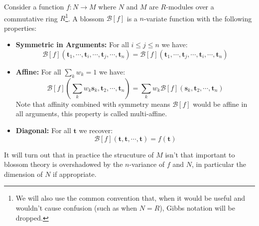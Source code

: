 
Consider a function $f:N\rightarrow M$ where $N$ and $M$ are $R$-modules over a commutative ring $R$\footnote{
We will also use the common convention that,
when it would be useful and wouldn't cause confusion (such as when $N=R$),
Gibbs notation will be dropped.
}.
A blossom $\mathcal{B}[f]$ is a $n$-variate function with the following properties:
\begin{itemize}
	\item {\bf Symmetric in Arguments:} For all $i\leq j\leq n$ we have:
		\[\mathcal{B}[f](\mathbf{t}_1,\cdots, \mathbf{t}_i, \cdots, \mathbf{t}_j, \cdots, \mathbf{t}_n) 
		= \mathcal{B}[f](\mathbf{t}_1,\cdots, \mathbf{t}_j, \cdots, \mathbf{t}_i, \cdots, \mathbf{t}_n) \]
	\item {\bf Affine:} For all $\sum_kw_k=1$ we have:
		\[\mathcal{B}[f]\left(\sum_kw_k\mathbf{s}_k,\mathbf{t}_2,\cdots,\mathbf{t}_n\right) = \sum_kw_k\mathcal{B}[f](\mathbf{s}_k,\mathbf{t}_2,\cdots,\mathbf{t}_n)\]
		Note that affinity combined with symmetry means $\mathcal{B}[f]$ would be affine in all arguments,
		this property is called multi-affine.
	\item {\bf Diagonal:} For all $\mathbf{t}$ we recover:
		\[\mathcal{B}[f](\mathbf{t},\mathbf{t},\cdots,\mathbf{t}) = f(\mathbf{t})\]
\end{itemize}
It will turn out that in practice the strucuture of $M$ isn't that important to blossom theory is overshadowed by the $n$-variance of $f$ and $N$, in particular the dimension of $N$ if appropriate.
